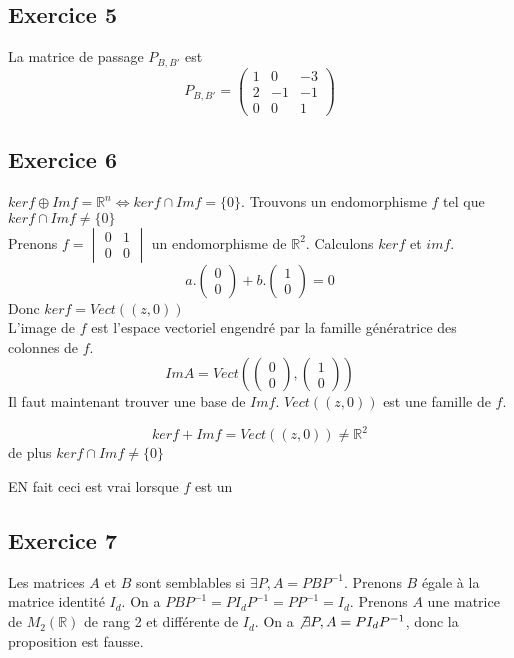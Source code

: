 \documentclass[]{book}
\theoremstyle{definition}
\newcommand{\bb}[1]{\mathbb{#1}}
\newcommand{\R}{\bb{R}}
\begin{document}
\subsection*{Exercice 5}
La matrice de passage $P_{B,B'}$ est 
$$
P_{B,B'} = \begin{pmatrix}1&0&-3\\2&-1&-1\\0&0&1\end{pmatrix}
$$


\subsection*{Exercice 6}
$ker f \oplus Im f = \R^n \Leftrightarrow ker f \cap Im f = \{0\}$. Trouvons un endomorphisme $f$ tel que $ker f \cap Im f \neq \{0\}$\\

Prenons $f=\begin{vmatrix} 0 & 1 \\ 0 & 0\end{vmatrix}$ un endomorphisme de $\R^2$. Calculons $ker f$ et $im f$.
$$
a.\begin{pmatrix}0 \\ 0 \end{pmatrix} + b.\begin{pmatrix}1 \\ 0 \end{pmatrix} = 0
$$ 
Donc $ker f = Vect((z,0))$\\

L'image de $f$ est l'espace vectoriel engendr\'e par la famille g\'en\'eratrice des colonnes de $f$.
$$Im A =  Vect(\begin{pmatrix} 0 \\ 0 \end{pmatrix},\begin{pmatrix} 1 \\ 0 \end{pmatrix})$$
Il faut maintenant trouver une base de $Im f$. $Vect((z,0))$ est une famille de $f$.

$$ker f + Im f = Vect((z,0)) \neq \R^2$$
de plus $ker f \cap Im f \neq \{0\}$

EN fait ceci est vrai lorsque $f$ est un 


\subsection*{Exercice 7}
Les matrices $A$ et $B$ sont semblables si $\exists P, A = PBP^{-1}$. 
Prenons $B$ \'egale \`a la matrice identit\'e $I_{d}$. On a $PBP^{-1} = PI_{d}P^{-1} = PP^{-1} = I_{d}$. Prenons $A$ une matrice de $M_2(\R)$ de rang 2 et diff\'erente de $I_d$. On a $\not\exists P, A = PI_{d}P^{-1}$, donc la proposition est fausse.
\end{document}
